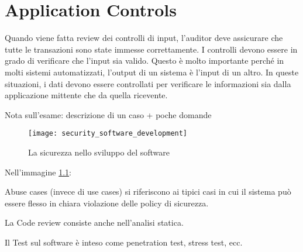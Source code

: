 \chapter{Application Controls}
\label{cs:ac}

Quando viene fatta review dei controlli di input, l'auditor deve
assicurare che tutte le transazioni sono state immesse correttamente.
I controlli devono essere in grado di verificare che l'input sia valido.
Questo è molto importante perché in molti sistemi automatizzati,
l'output di un sistema è l'input di un altro. In queste situazioni,
i dati devono essere controllati per verificare le informazioni sia
dalla applicazione mittente che da quella ricevente.



Nota sull'esame: descrizione di un caso + poche domande

\begin{figure}[h!]
        \begin{center}
                \texttt{[image: security\_software\_development]}
        \end{center}
        \caption{La sicurezza nello sviluppo del software}
        \label{fig:security:software:development}
\end{figure}

Nell'immagine \ref{fig:security:software:development}:

\begin{enumerate*}[label=\alph*)]
	\item Abuse cases (invece di use cases) si riferiscono ai  tipici 
	casi in cui il sistema può essere flesso in chiara violazione delle
	policy di sicurezza. 
	\item La Code review consiste anche nell'analisi statica.
	\item Il Test sul software è inteso come penetration test, stress test, ecc.
\end{enumerate*}

